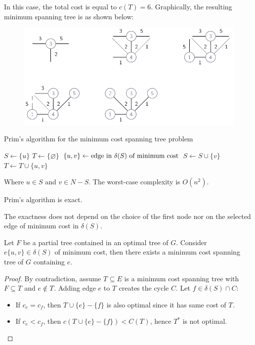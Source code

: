\begin{example}
\begin{itemize}
\begin{itemize}
        \end{itemize}
    \end{itemize}
    In this case, the total cost is equal to $c(T)=6$. 
    Graphically, the resulting minimum spanning tree is as shown below:
    \begin{figure}[H]
        \centering
        \includegraphics[width=0.75\linewidth]{images/MST.png}
    \end{figure}
\end{example}
\begin{algorithm}[H]
    \caption{Prim's algorithm for the minimum cost spanning tree problem}
        \begin{algorithmic}[1]
            \State $S \leftarrow \{u\}$
            \State $T \leftarrow \{\varnothing\}$
                \State $\{u,v\}\leftarrow \textnormal{edge in } \delta(S) \textnormal{ of minimum cost}$
                \State $S \leftarrow S \cup \{v\}$
                \State $T \leftarrow T \cup \{u,v\}$
            \EndWhile
        \end{algorithmic}
\end{algorithm}
Where $u \in S$ and $v \in N-S$. 
The worst-case complexity is $O(n^2)$. 
\newpage
\begin{proposition}
    Prim's algorithm is exact. 
\end{proposition}        
The exactness does not depend on the choice of the first node nor on the selected edge of minimum cost in $\delta(S)$. 
\begin{property}
    Let $F$ be a partial tree contained in an optimal tree of $G$. 
    Consider $e\{u,v\}\in \delta(S)$ of minimum cost, then there exists a minimum cost spanning tree of $G$ containing $e$. 
\end{property}
\begin{proof}
    By contradiction, assume $T^{} \subseteq E$ is a minimum cost spanning tree with $F \subseteq T^{}$ and $e \notin T^{}$. 
    Adding edge $e$ to $T^{}$ creates the cycle $C$. 
    Let $f \in \delta(S) \cap C$: 
    \begin{itemize}
        \item If $c_e=c_f$, then $T^{}\cup\{e\}-\{f\}$ is also optimal since it has same cost of $T^{}$.
        \item If $c_e<c_f$, then $c\left(T^{}\cup\{e\}-\{f\}\right)<C(T^{})$, hence $T^{*}$ is not optimal.
    \end{itemize}
\end{proof}
